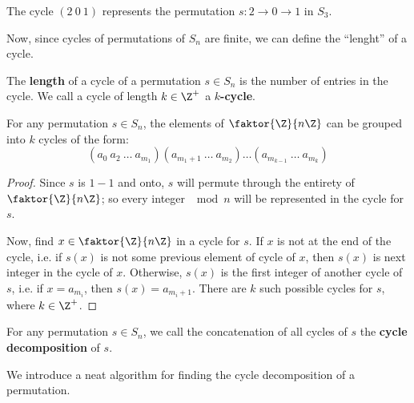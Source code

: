 \begin{example}
    The cycle $(2 \ 0 \ 1)$ represents the permutation $s:2 \rightarrow 0
    \rightarrow 1$ in $S_3$.
\end{example}

Now, since cycles of permutations of $S_n$ are finite, we can define the
``lenght'' of a cycle.

\begin{definition}
    The \textbf{length} of a cycle of a permutation $s \in S_n$ is the number of
    entries in the cycle. We call a cycle of length  $k \in \Z^+$ a
    \textbf{$k$-cycle}.
\end{definition}

\begin{lemma}\label{1.4.3}
    For any permutation $s \in S_n$, the elements of  $\faktor{\Z}{n\Z}$ can be
    grouped into $k$ cycles of the form:
    \begin{equation}
        (a_0 \ a_2 \ \dots \ a_{m_1})(a_{m_1+1} \ \dots \ a_{m_2}) \dots
        (a_{m_{k-1}} \ \dots \ a_m_k)
    \end{equation}
\end{lemma}
\begin{proof}
    Since $s$ is  $1-1$ and onto,  $s$ will permute through the entirety of
    $\faktor{\Z}{n\Z}$; so every integer $\mod{n}$ will be represented in the
    cycle for $s$.

    Now, find  $x \in \faktor{\Z}{n\Z}$ in a cycle for $s$. If  $x$ is not at
    the end of the cycle, i.e. if  $s(x)$ is not some previous element of cycle
    of $x$, then $s(x)$ is next integer in the cycle of $x$. Otherwise,  $s(x)$
    is the first integer of another cycle of $s$, i.e. if  $x=a_{m_i}$, then
    $s(x)=a_{m_i+1}$. There are $k$ such possible cycles for  $s$, where  $k \in
    \Z^+$.
\end{proof}

\begin{definition}
    For any permutation $s \in S_n$, we  call the concatenation of all cycles
    of $s$ the  \textbf{cycle decomposition} of $s$.
\end{definition}

We introduce a neat algorithm for finding the cycle decomposition of a
permutation.

